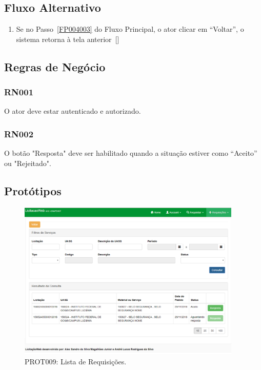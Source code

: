 \begin{anexosenv}
\subsection*{Fluxo Alternativo}
\begin{enumerate}
    \item Se no Passo~\ref{FP004003} do Fluxo Principal, o ator clicar em ``Voltar'', o sistema retorna à tela anterior~[]
\end{enumerate}

\subsection*{Regras de Negócio}

\subsubsection*{RN001}\label{rn014}
O ator deve estar autenticado e autorizado.

\subsubsection*{RN002}\label{rn013}
O botão "Resposta" deve ser habilitado quando a situação estiver como “Aceito” ou "Rejeitado".

\subsection*{Protótipos}
\begin{figure}[htbp]
    \centering
    \includegraphics[width=0.95\textwidth]{figuras/prototipo009.png}
    \caption[PROT009]{PROT009: Lista de Requisições.}
    \label{PROT009}
\end{figure}


\end{anexosenv}
